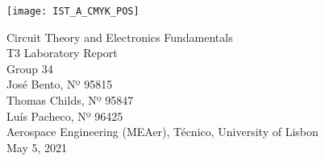 
\thispagestyle {empty}

\texttt{[image: IST\_A\_CMYK\_POS]}

\begin{center}
%
\vspace{1.0cm}

\vspace{1cm}
{\FontLb Circuit Theory and Electronics Fundamentals} \\ %
\vspace{5cm}
{\FontLn T3 Laboratory Report}\vspace{1cm} \\
\vspace{5cm}
{\FontLb Group 34} \\
\vspace{1cm}
{\FontSn José Bento, Nº 95815} \\
{\FontSn Thomas Childs, Nº 95847} \\
{\FontSn Luís Pacheco, Nº 96425} \\
\vspace{1cm}
{\FontSn Aerospace Engineering (MEAer), Técnico, University of Lisbon} \\ %
\vspace{1cm}
{\FontSn May 5, 2021} \\ %
%
\end{center}

